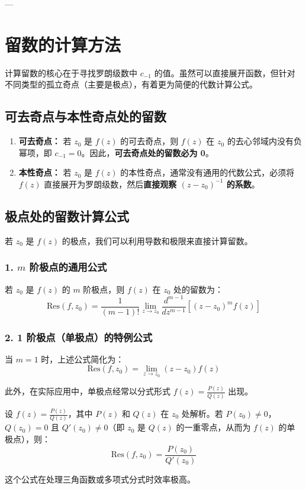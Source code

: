 ---

\section{留数的计算方法}

计算留数的核心在于寻找罗朗级数中 $c_{-1}$ 的值。虽然可以直接展开函数，但针对不同类型的孤立奇点（主要是极点），有着更为简便的代数计算公式。

\subsection{可去奇点与本性奇点处的留数}
\begin{enumerate}
	\item \textbf{可去奇点：} 若 $z_0$ 是 $f(z)$ 的可去奇点，则 $f(z)$ 在 $z_0$ 的去心邻域内没有负幂项，即 $c_{-1} = 0$。因此，\textbf{可去奇点处的留数必为 0}。
	\item \textbf{本性奇点：} 若 $z_0$ 是 $f(z)$ 的本性奇点，通常没有通用的代数公式，必须将 $f(z)$ 直接展开为罗朗级数，然后\textbf{直接观察 $(z-z_0)^{-1}$ 的系数}。
\end{enumerate}

\subsection{极点处的留数计算公式}
若 $z_0$ 是 $f(z)$ 的极点，我们可以利用导数和极限来直接计算留数。

\subsubsection{1. $m$ 阶极点的通用公式}
\begin{theorem}
	若 $z_0$ 是 $f(z)$ 的 $m$ 阶极点，则 $f(z)$ 在 $z_0$ 处的留数为：
	$$ \text{Res}(f, z_0) = \frac{1}{(m-1)!} \lim_{z \to z_0} \frac{d^{m-1}}{dz^{m-1}} \left[ (z - z_0)^m f(z) \right] $$
\end{theorem}

\subsubsection{2. 1 阶极点（单极点）的特例公式}
当 $m = 1$ 时，上述公式简化为：
$$ \text{Res}(f, z_0) = \lim_{z \to z_0} (z - z_0) f(z) $$

此外，在实际应用中，单极点经常以分式形式 $f(z) = \frac{P(z)}{Q(z)}$ 出现。
\begin{theorem}[分式型单极点公式]
	设 $f(z) = \frac{P(z)}{Q(z)}$，其中 $P(z)$ 和 $Q(z)$ 在 $z_0$ 处解析。若 $P(z_0) \neq 0$，$Q(z_0) = 0$ 且 $Q'(z_0) \neq 0$（即 $z_0$ 是 $Q(z)$ 的一重零点，从而为 $f(z)$ 的单极点），则：
	$$ \text{Res}(f, z_0) = \frac{P(z_0)}{Q'(z_0)} $$
\end{theorem}
这个公式在处理三角函数或多项式分式时效率极高。

